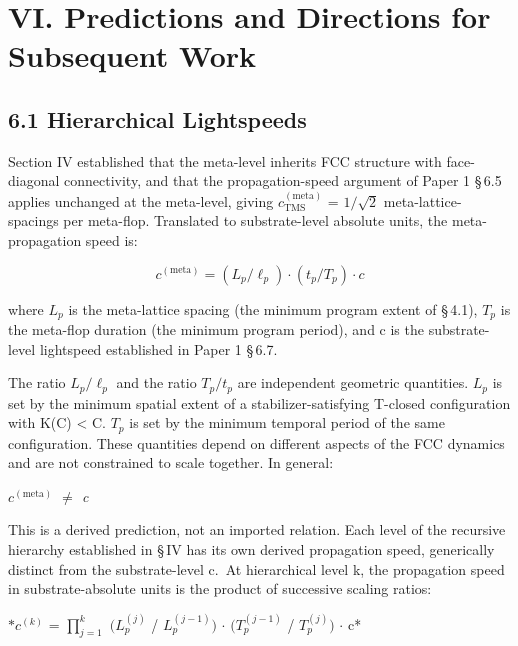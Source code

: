 \documentclass[11pt,oneside]{report}
\theoremstyle{definition}
\theoremstyle{remark}
\begin{document}
\section*{VI. Predictions and Directions for Subsequent Work}

\subsection*{6.1 Hierarchical Lightspeeds}

Section IV established that the meta-level inherits FCC structure with
face-diagonal connectivity, and that the propagation-speed argument of
Paper 1 \S\,6.5 applies unchanged at the meta-level, giving \ensuremath{c_{\mathrm{TMS}}^{(\text{meta})}}
= \ensuremath{1/\sqrt{2}} meta-lattice-spacings per meta-flop. Translated to
substrate-level absolute units, the meta-propagation speed is:

\begin{equation*}
c^{(\text{meta})} = (L_{p} / \ell_{p}) \cdot (t_{p} / T_{p}) \cdot c
\end{equation*}

where \ensuremath{L_{p}} is the meta-lattice spacing (the minimum program extent of
\S\,4.1), \ensuremath{T_{p}} is the meta-flop duration (the minimum program period), and
c is the substrate-level lightspeed established in Paper 1 \S\,6.7.

The ratio \ensuremath{L_{p}/\ell_{p}} and the ratio \ensuremath{T_{p}/t_{p}} are independent geometric
quantities. \ensuremath{L_{p}} is set by the minimum spatial extent of a
stabilizer-satisfying T-closed configuration with K(C) \textless{}
\textbar C\textbar. \ensuremath{T_{p}} is set by the minimum temporal period of the
same configuration. These quantities depend on different aspects of the
FCC dynamics and are not constrained to scale together. In general:

\emph{\ensuremath{c^{(\text{meta})}} \ensuremath{\neq} c}

This is a derived prediction, not an imported relation. Each level of
the recursive hierarchy established in \S\,IV has its own derived
propagation speed, generically distinct from the substrate-level c.~At
hierarchical level k, the propagation speed in substrate-absolute units
is the product of successive scaling ratios:

\ensuremath{*c^{(k)}} = \ensuremath{\prod _{j=1}^{k}} \ensuremath{(L_{p}^{(j)}} / \ensuremath{L_{p}^{(j-1)})} \ensuremath{\cdot}
\ensuremath{(T_{p}^{(j-1)}} / \ensuremath{T_{p}^{(j)})} \ensuremath{\cdot} c*
\end{document}
